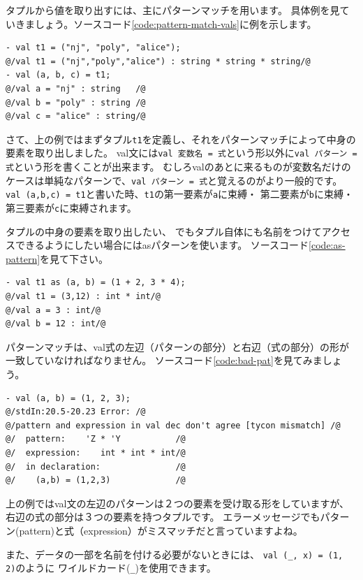 \documentclass[11pt,a4paper]{article}
\begin{document}
タプルから値を取り出すには、主にパターンマッチを用います。
具体例を見ていきましょう。ソースコード\ref{code:pattern-match-vals}に例を示します。

\begin{lstlisting}[caption=val文でパターンマッチ,label=code:pattern-match-vals]
- val t1 = ("nj", "poly", "alice");
@/val t1 = ("nj","poly","alice") : string * string * string/@
- val (a, b, c) = t1;
@/val a = "nj" : string   /@
@/val b = "poly" : string /@
@/val c = "alice" : string/@
\end{lstlisting}

さて、上の例ではまずタプル\lstinline{t1}を定義し、それをパターンマッチによって中身の要素を取り出しました。
val文には\lstinline{val 変数名 = 式}という形以外に\lstinline{val パターン = 式}という形を書くことが出来ます。
むしろvalのあとに来るものが変数名だけのケースは単純なパターンで、\lstinline{val パターン = 式}と覚えるのがより一般的です。
\lstinline{val (a,b,c) = t1}と書いた時、\lstinline{t1}の第一要素が\lstinline{a}に束縛・
第二要素が\lstinline{b}に束縛・第三要素が\lstinline{c}に束縛されます。

タプルの中身の要素を取り出したい、
でもタプル自体にも名前をつけてアクセスできるようにしたい場合にはasパターンを使います。
ソースコード\ref{code:as-pattern}を見て下さい。

\begin{lstlisting}[caption=asパターン,label=code:as-pattern]
- val t1 as (a, b) = (1 + 2, 3 * 4);
@/val t1 = (3,12) : int * int/@
@/val a = 3 : int/@
@/val b = 12 : int/@
\end{lstlisting}

パターンマッチは、val式の左辺（パターンの部分）と右辺（式の部分）の形が一致していなければなりません。
ソースコード\ref{code:bad-pat}を見てみましょう。
\begin{lstlisting}[caption=型が合わないパターンマッチ,label=code:bad-pat]
- val (a, b) = (1, 2, 3);
@/stdIn:20.5-20.23 Error: /@
@/pattern and expression in val dec don't agree [tycon mismatch] /@
@/  pattern:    'Z * 'Y           /@
@/  expression:    int * int * int/@
@/  in declaration:               /@
@/    (a,b) = (1,2,3)             /@
\end{lstlisting}

上の例ではval文の左辺のパターンは２つの要素を受け取る形をしていますが、
右辺の式の部分は３つの要素を持つタプルです。
エラーメッセージでもパターン(pattern)と式（expression）がミスマッチだと言っていますよね。

また、データの一部を名前を付ける必要がないときには、
\lstinline{val (_, x) = (1, 2)}のように
ワイルドカード(\lstinline{_})を使用できます。
\end{document}
